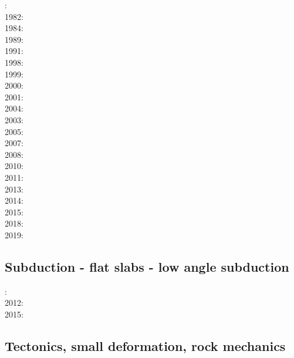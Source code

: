 : \cite{bird78}\\
1982: \cite{clwv82}\\
1984: \cite{cade84}\\
1989: \cite{clwv89}\\
1991: \cite{muph91}\\
1998: \cite{togu98}\\
1999: \cite{fagd99}\\
2000: \cite{pybf00}\\
2001: \cite{dohe01}\cite{reyb01}\cite{brry01}\\
2004: \cite{ster04}\cite{guhl04}\\
2003: \cite{hags03}\\
2005: \cite{bihi05}\\
2007: \cite{kore07}\\
2008: \cite{uegs08}\\
2010: \cite{nigm10}\cite{bucl10}\\
2011: \cite{bagw11}\cite{nigm11}\\
2013: \cite{dyge13}\cite{mana13}\cite{kore13}\\
2014: \cite{recf14}\cite{macg14}\\
2015: \cite{matv15}\cite{pebu15}\cite{vapm15}\\
2018: \cite{zhlg18}\cite{basq18}\\
2019: \cite{begb19}\cite{gubg19}

\subsection*{Subduction - flat slabs - low angle subduction}

: \cite{cube11}\\
2012: \cite{mapm12}\\
2015: \cite{gehm15}

\subsection*{Tectonics, small deformation, rock mechanics}

\noindent
\cite{ilma93}
\cite{hept96}
\cite{esfm08}
\cite{lega12}

